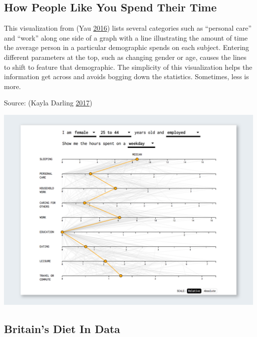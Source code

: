 \documentclass[]{book}
\begin{document}
\hypertarget{how-people-like-you-spend-their-time}{%
\subsection{How People Like You Spend Their Time}\label{how-people-like-you-spend-their-time}}

This visualization from (Yau \protect\hyperlink{ref-spendingtime}{2016}) lists several categories such as ``personal care'' and ``work'' along one side of a graph with a line illustrating the amount of time the average person in a particular demographic spends on each subject. Entering different parameters at the top, such as changing gender or age, causes the lines to shift to feature that demographic. The simplicity of this visualization helps the information get across and avoids bogging down the statistics. Sometimes, less is more.

Source: (Kayla Darling \protect\hyperlink{ref-cool_data}{2017})

\includegraphics{images/SpendingTime.png}

\hypertarget{britains-diet-in-data}{%
\subsection{Britain's Diet In Data}\label{britains-diet-in-data}}
\end{document}
